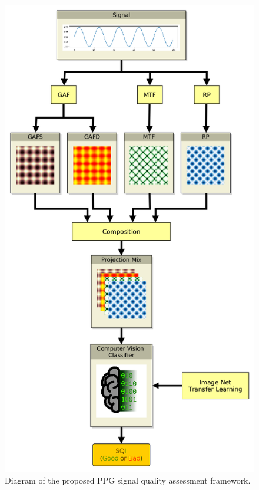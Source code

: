 \begin{figure}[t]
	\centering
	\includegraphics[height=0.98\textheight]{img/method.png}
	\caption{Diagram of the proposed PPG signal quality assessment framework.}
	\label{fig:method}
\end{figure}
